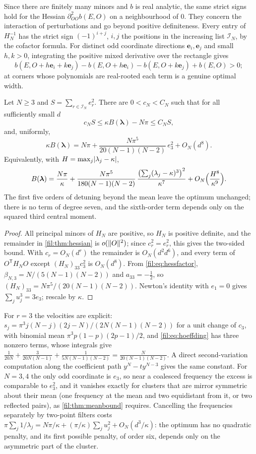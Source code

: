 Since there are finitely many minors and $b$ is real analytic, the same strict signs hold for the Hessian
$\partial^2_{OO}b(E,O)$ on a neighbourhood of $0$. They concern the interaction of perturbations and go beyond
positive definiteness. Every entry of $H_N^{-1}$ has the strict sign $(-1)^{i+j}$, $i,j$ the positions in the
increasing list $\mathcal I_N$, by the cofactor formula. For distinct odd coordinate directions $\mathbf e_i,\mathbf e_j$
and small $h,k>0$, integrating the positive mixed derivative over the rectangle gives
\[
 b(E,O+h\mathbf e_i+k\mathbf e_j)-b(E,O+h\mathbf e_i)-b(E,O+k\mathbf e_j)+b(E,O)>0;
\]
at corners whose polynomials are real-rooted each term is a genuine optimal width.

\begin{corollary}\label{fil:cor:sixth}
Let $N\ge3$ and $S=\sum_{r\in\mathcal I_N}e_r^2$. There are $0<c_N<C_N$ such that for all sufficiently small $d$
\[
 c_NS\le\kappa B(\boldsymbol\lambda)-N\pi\le C_NS,
\]
and, uniformly,
\[
 \kappa B(\boldsymbol\lambda)=N\pi+\frac{N\pi^5}{20(N-1)(N-2)}\,e_3^2+O_N(d^8).
\]
Equivalently, with $H=\max_j\lvert\lambda_j-\kappa\rvert$,
\[
 B(\boldsymbol\lambda)=\frac{N\pi}\kappa+\frac{N\pi^5}{180(N-1)(N-2)}\,\frac{\bigl(\sum_j(\lambda_j-\kappa)^3\bigr)^2}{\kappa^7}
 +O_N\Bigl(\frac{H^8}{\kappa^9}\Bigr).
\]
The first five orders of detuning beyond the mean leave the optimum unchanged; there is no term of degree
seven, and the sixth-order term depends only on the squared third central moment.
\end{corollary}

\begin{proof}
All principal minors of $H_N$ are positive, so $H_N$ is positive definite, and the remainder in
\cref{fil:thm:hessian} is $o(\lVert O\rVert^2)$; since $c_r^2=e_r^2$, this gives the two-sided bound. With $c_r=O_N(d^r)$ the
remainder is $O_N(d^2d^6)$, and every term of $O^{\mathsf T}H_NO$ except $(H_N)_{33}c_3^2$ is $O_N(d^8)$. From
\eqref{fil:eq:hessfactor}, $\beta_{N,3}=N/(5(N-1)(N-2))$ and $a_{33}=-\tfrac12$, so $(H_N)_{33}=N\pi^5/(20(N-1)(N-2))$. Newton's
identity with $e_1=0$ gives $\sum_ju_j^3=3e_3$; rescale by $\kappa$.
\end{proof}

For $r=3$ the velocities are explicit: $s_j=\pi^3j(N-j)(2j-N)/(2N(N-1)(N-2))$ for a unit change of $c_3$, with binomial
mean $\pi^3p(1-p)(2p-1)/2$, and \eqref{fil:eq:hoeffding} has three nonzero terms, whose integrals give
$\frac1{20N}+\frac3{20N(N-1)}+\frac1{5N(N-1)(N-2)}=\frac N{20(N-1)(N-2)}$. A direct second-variation computation along the
coefficient path $y^N-ty^{N-3}$ gives the same constant. For $N=3,4$ the only odd coordinate is $e_3$, so near a
coalesced frequency the excess is comparable to $e_3^2$, and it vanishes exactly for clusters that are mirror
symmetric about their mean (one frequency at the mean and two equidistant from it, or two reflected pairs), as
\cref{fil:thm:meanbound} requires. Cancelling the frequencies separately by two-point filters costs
$\pi\sum_j1/\lambda_j=N\pi/\kappa+(\pi/\kappa)\sum_ju_j^2+O_N(d^3/\kappa)$: the optimum has no quadratic penalty, and its
first possible penalty, of order six, depends only on the asymmetric part of the cluster.

